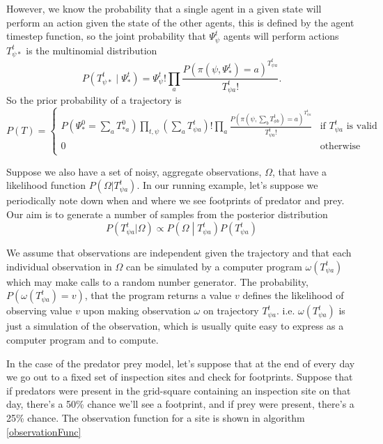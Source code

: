 However, we know the probability that a single agent in a given state will perform an action given the state of the other agents, this is defined by the agent timestep function, so the joint probability that $\Psi^t_\psi$ agents will perform actions $T^t_{\psi *}$ is the multinomial distribution
\[
P\left(T^t_{\psi *} \mid \Psi^t_*\right) = \Psi^t_\psi!\prod_a \frac{P(\pi(\psi,\Psi^t_*)=a)^{T^{t}_{\psi a}}}{T^{t}_{\psi a}!}.
\]
So the prior probability of a trajectory is
\[
P(T) =
\begin{cases}
P(\Psi^0_* = \sum_aT^0_{* a}) \prod_{t, \psi}\left(\sum_a T^t_{\psi a}\right)!\prod_a \frac{P(\pi(\psi,\sum_bT^{t}_{\phi b})=a)^{T^{t}_{\psi a}}}{T^{t}_{\psi a}!} & \text{if } T^t_{\psi a} \text{ is valid} \\
0 & \text{otherwise}\\
\end{cases}
\]

Suppose we also have a set of noisy, aggregate observations, $\Omega$, that have a likelihood function $P(\Omega|T^t_{\psi a})$. In our running example, let's suppose we periodically note down when and where we see footprints of predator and prey. Our aim is to generate a number of samples from the posterior distribution
\[
P(T^t_{\psi a}|\Omega) \propto P\left(\Omega \middle| T^{t}_{\psi a}\right)P(T^t_{\psi a})
\]

We assume that observations are independent given the trajectory and that each individual observation in $\Omega$ can be simulated by a computer program $\omega(T^t_{\psi a})$ which may make calls to a random number generator. The probability, $P(\omega(T^t_{\psi a}) = v)$, that the program returns a value $v$ defines the likelihood of observing value $v$ upon making observation $\omega$ on trajectory $T^t_{\psi a}$. i.e. $\omega(T^t_{\psi a})$ is just a simulation of the observation, which is usually quite easy to express as a computer program and to compute. 

In the case of the predator prey model, let's suppose that at the end of every day we go out to a fixed set of inspection sites and check for footprints. Suppose that if predators were present in the grid-square containing an inspection site on that day, there's a 50\% chance we'll see a footprint, and if prey were present, there's a 25\% chance. The observation function for a site is shown in algorithm \ref{observationFunc}

